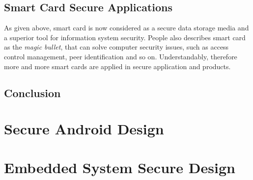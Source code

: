 \subsection{Smart Card Secure Applications}
As given above, smart card is now considered as a secure data storage media and a superior tool for information system security.  People also describes smart card as the \emph{magic bullet}, that can solve computer security issues, such as access control management,  peer identification and so on. Understandably, therefore more and more smart cards are applied in secure application and products.
\subsection{Conclusion}

\section{Secure Android Design}

\section{Embedded System Secure Design}